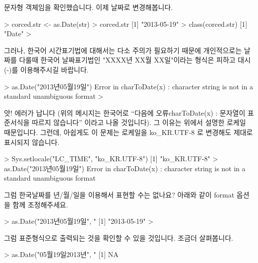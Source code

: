 \documentclass[tutorial.tex]{subfiles}
\begin{document}
문자형 객체임을 확인했습니다.
이제 날짜로 변경해봅니다.

\begin{Schunk}
\begin{Soutput} 
> corced.str <- as.Date(str)
> corced.str 
[1] "2013-05-19"
> class(corced.str)
[1] "Date"
> 
\end{Soutput}
\end{Schunk}

그러나, 한국어 시간표기법에 대해서는 다소 주의가 필요하기 때문에 개인적으로는 날짜를 다룰때 한국어 날짜표기법인 "XXXX년 XX월 XX일"이라는 형식은 피하고 대시 (-)를 이용해주시길 바랍니다. 

\begin{Schunk}
\begin{Soutput} 
> as.Date("2013년05월19일")
Error in charToDate(x) : 
  character string is not in a standard unambiguous format
> 
\end{Soutput}
\end{Schunk}

앗! 에러가 납니다 (위의 메시지는 한국어로 ``다음에 오류charToDate(x) : 문자열이 표준서식을 따르지 않습니다'' 이라고 나올 것입니다).  
그 이유는 위에서 설명한 로케일 때문입니다.
그런데, 아쉽게도 이 문제는 로케일을 ko\_KR.UTF-8 로 변경해도 제대로 표시되지 않습니다. 

\begin{Schunk}
\begin{Soutput} 
> Sys.setlocale("LC_TIME", "ko_KR.UTF-8")
[1] "ko_KR.UTF-8"
> as.Date("2013년05월19일")
Error in charToDate(x) : 
  character string is not in a standard unambiguous format
\end{Soutput}
\end{Schunk}

그럼 한국날짜를 년/월/일을 이용해서 표현할 수는 없나요? 
아래와 같이 format 옵션을 함께 조정해주세요.

\begin{Schunk}
\begin{Soutput} 
> as.Date("2013년05월19일", "%Y년%m월%d일")
[1] "2013-05-19"
> 
\end{Soutput}
\end{Schunk}

그럼 표준형식으로 출력되는 것을 확인할 수 있을 것입니다.
조금더 살펴봅니다.

\begin{Schunk}
\begin{Soutput} 
> as.Date("05월19일2013년", "%Y년%m월%d일")
[1] NA
\end{Soutput}
\end{Schunk}
\end{document}
